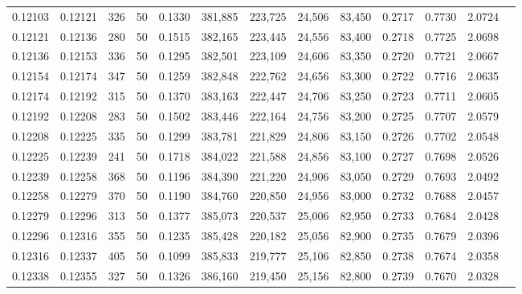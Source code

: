 \begin{tabular}{rrrrrrrrrrrrr}
0.12103 & 0.12121 &   326 &  50 &                                     0.1330 & 381,885 & 223,725 &  24,506 &  83,450 & 0.2717 & 0.7730 & 2.0724 \\
0.12121 & 0.12136 &   280 &  50 &                                     0.1515 & 382,165 & 223,445 &  24,556 &  83,400 & 0.2718 & 0.7725 & 2.0698 \\
0.12136 & 0.12153 &   336 &  50 &                                     0.1295 & 382,501 & 223,109 &  24,606 &  83,350 & 0.2720 & 0.7721 & 2.0667 \\
0.12154 & 0.12174 &   347 &  50 &                                     0.1259 & 382,848 & 222,762 &  24,656 &  83,300 & 0.2722 & 0.7716 & 2.0635 \\
0.12174 & 0.12192 &   315 &  50 &                                     0.1370 & 383,163 & 222,447 &  24,706 &  83,250 & 0.2723 & 0.7711 & 2.0605 \\
0.12192 & 0.12208 &   283 &  50 &                                     0.1502 & 383,446 & 222,164 &  24,756 &  83,200 & 0.2725 & 0.7707 & 2.0579 \\
0.12208 & 0.12225 &   335 &  50 &                                     0.1299 & 383,781 & 221,829 &  24,806 &  83,150 & 0.2726 & 0.7702 & 2.0548 \\
0.12225 & 0.12239 &   241 &  50 &                                     0.1718 & 384,022 & 221,588 &  24,856 &  83,100 & 0.2727 & 0.7698 & 2.0526 \\
0.12239 & 0.12258 &   368 &  50 &                                     0.1196 & 384,390 & 221,220 &  24,906 &  83,050 & 0.2729 & 0.7693 & 2.0492 \\
0.12258 & 0.12279 &   370 &  50 &                                     0.1190 & 384,760 & 220,850 &  24,956 &  83,000 & 0.2732 & 0.7688 & 2.0457 \\
0.12279 & 0.12296 &   313 &  50 &                                     0.1377 & 385,073 & 220,537 &  25,006 &  82,950 & 0.2733 & 0.7684 & 2.0428 \\
0.12296 & 0.12316 &   355 &  50 &                                     0.1235 & 385,428 & 220,182 &  25,056 &  82,900 & 0.2735 & 0.7679 & 2.0396 \\
0.12316 & 0.12337 &   405 &  50 &                                     0.1099 & 385,833 & 219,777 &  25,106 &  82,850 & 0.2738 & 0.7674 & 2.0358 \\
0.12338 & 0.12355 &   327 &  50 &                                     0.1326 & 386,160 & 219,450 &  25,156 &  82,800 & 0.2739 & 0.7670 & 2.0328 \\

\end{tabular}
